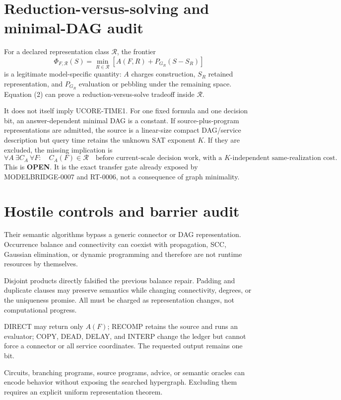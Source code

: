\documentclass[11pt]{article}
\newcommand{\OPEN}{\textbf{OPEN}}
\begin{document}
\section{Reduction-versus-solving and minimal-DAG audit}

For a declared representation class $\mathcal R$, the frontier
\[
 \Phi_{F,\mathcal R}(S)=
 \min_{R\in\mathcal R}
 \left[A(F,R)+P_{G_R}(S-S_R)\right]                         \tag{2}
\]
is a legitimate model-specific quantity: $A$ charges construction, $S_R$
retained representation, and $P_{G_R}$ evaluation or pebbling under the
remaining space.  Equation (2) can prove a reduction-versus-solve tradeoff
inside $\mathcal R$.

It does not itself imply UCORE-TIME1.  For one fixed formula and one decision
bit, an answer-dependent minimal DAG is a constant.  If source-plus-program
representations are admitted, the source is a linear-size compact DAG/service
description but query time retains the unknown SAT exponent $K$.  If they are
excluded, the missing implication is
\[
\tag{DAG-COMPILER1}
\forall A\ \exists C_A\ \forall F:\quad
C_A(F)\in\mathcal R
\quad\text{before current-scale decision work, with a $K$-independent
same-realization cost.}
\]
This is \OPEN.  It is the exact transfer gate already exposed by
MODELBRIDGE-0007 and RT-0006, not a consequence of graph minimality.

\section{Hostile controls and barrier audit}

\begin{description}[leftmargin=3.3cm,style=nextline]
\item[Horn, 2-SAT, affine/Tseitin, bounded treewidth.]
Their semantic algorithms bypass a generic connector or DAG representation.
Occurrence balance and connectivity can coexist with propagation, SCC,
Gaussian elimination, or dynamic programming and therefore are not runtime
resources by themselves.
\item[Products, padding, and redundant clauses.]
Disjoint products directly falsified the previous balance repair.  Padding
and duplicate clauses may preserve semantics while changing connectivity,
degrees, or the uniqueness promise.  All must be charged as representation
changes, not computational progress.
\item[Wrappers and one-bit output.]
DIRECT may return only $A(F)$; RECOMP retains the source and runs an evaluator;
COPY, DEAD, DELAY, and INTERP change the ledger but cannot force a connector
or all service coordinates.  The requested output remains one bit.
\item[Compact representations and nonuniformity.]
Circuits, branching programs, source programs, advice, or semantic oracles
can encode behavior without exposing the searched hypergraph.  Excluding
them requires an explicit uniform representation theorem.
\end{description}
\end{document}

